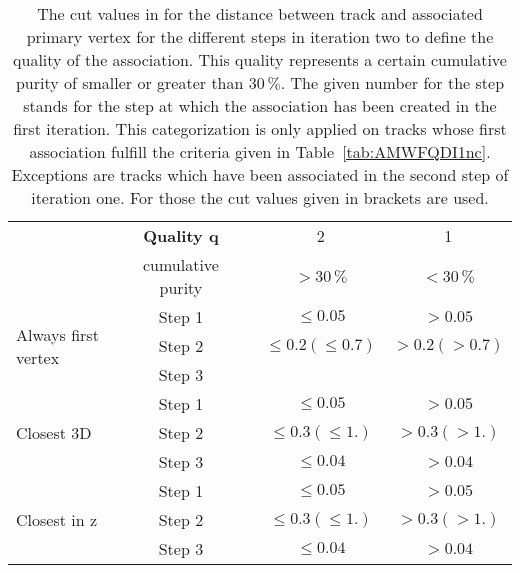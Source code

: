 
\begin{table}[h]
\begin{center}
\caption{The cut values in \cm for the distance between track and associated primary vertex for the different steps in iteration two to define the quality of the association. This quality represents a certain cumulative purity of smaller or greater than $30\,\%$. The given number for the step stands for the step at which the association has been created in the first iteration. This categorization is only applied on tracks whose first association fulfill the criteria given in Table~\ref{tab:AMWFQDI1nc}. Exceptions are tracks which have been associated in the second step of iteration one. For those the cut values given in brackets are used.}
\label{tab:AMWFQDI2}

\begin{tabular}{l c c | c | c}
 	& \textbf{Quality q} & & 2 & 1  \\
 	& cumulative purity & & $>30\,\%$ & $<30\,\%$    \\
\hline \hline
\multirow{3}{*}{Always first vertex} 
	& Step 1 & & $\leq0.05$ & $>0.05$ \\
\cline{2-5} 
	 & Step 2 & & $\leq0.2 \left(\leq0.7\right)$ & $>0.2\left(>0.7\right)$ \\
\cline{2-5} 
	& Step 3 & &  &  \\
\hline \hline
\multirow{3}{*}{Closest 3D} 
	& Step 1 & & $\leq0.05$ & $>0.05$ \\
\cline{2-5} 
	 &  Step 2 & & $\leq0.3 \left(\leq1.\right)$ & $>0.3\left(>1.\right)$ \\
\cline{2-5} 
	& Step 3 & & $\leq0.04$ & $>0.04$ \\
\hline \hline
\multirow{3}{*}{Closest in z} 
	& Step 1 & & $\leq0.05$ & $>0.05$ \\
\cline{2-5} 
	 &  Step 2 & & $\leq0.3 \left(\leq1.\right)$ & $>0.3\left(>1.\right)$ \\
\cline{2-5} 
	& Step 3 & & $\leq0.04$ & $>0.04$ \\
\end{tabular}

\end{center}
\end{table}